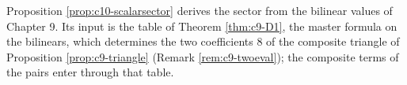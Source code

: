 \begin{remark}
\label{rem:c10-inputs}
Proposition \ref{prop:c10-scalarsector} derives the sector from the bilinear values of Chapter 9. Its input is the table of Theorem \ref{thm:c9-D1}, the master formula on the bilinears, which determines the two coefficients $8$ of the composite triangle of Proposition \ref{prop:c9-triangle} (Remark \ref{rem:c9-twoeval}); the composite terms of the pairs enter through that table.
\end{remark}
